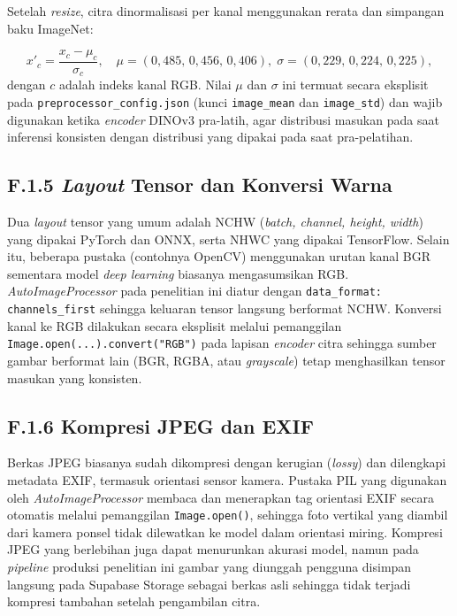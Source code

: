 Setelah \textit{resize}, citra dinormalisasi per kanal menggunakan rerata dan simpangan baku ImageNet:

\begin{equation}
    x'_c = \frac{x_c - \mu_c}{\sigma_c}, \quad
    \mu = (0{,}485,\, 0{,}456,\, 0{,}406), \;
    \sigma = (0{,}229,\, 0{,}224,\, 0{,}225),
    \label{eq:norm}
\end{equation}
dengan $c$ adalah indeks kanal RGB. Nilai $\mu$ dan $\sigma$ ini termuat secara eksplisit pada \texttt{preprocessor\_config.json} (kunci \texttt{image\_mean} dan \texttt{image\_std}) dan wajib digunakan ketika \textit{encoder} DINOv3 pra-latih, agar distribusi masukan pada saat inferensi konsisten dengan distribusi yang dipakai pada saat pra-pelatihan.

\subsection*{F.1.5 \textit{Layout} Tensor dan Konversi Warna}

Dua \textit{layout} tensor yang umum adalah NCHW (\textit{batch, channel, height, width}) yang dipakai PyTorch dan ONNX, serta NHWC yang dipakai TensorFlow. Selain itu, beberapa pustaka (contohnya OpenCV) menggunakan urutan kanal BGR sementara model \textit{deep learning} biasanya mengasumsikan RGB. \textit{AutoImageProcessor} pada penelitian ini diatur dengan \texttt{data\_format: channels\_first} sehingga keluaran tensor langsung berformat NCHW. Konversi kanal ke RGB dilakukan secara eksplisit melalui pemanggilan \texttt{Image.open(...).convert("RGB")} pada lapisan \textit{encoder} citra sehingga sumber gambar berformat lain (BGR, RGBA, atau \textit{grayscale}) tetap menghasilkan tensor masukan yang konsisten.

\subsection*{F.1.6 Kompresi JPEG dan EXIF}

Berkas JPEG biasanya sudah dikompresi dengan kerugian (\textit{lossy}) dan dilengkapi metadata EXIF, termasuk orientasi sensor kamera. Pustaka PIL yang digunakan oleh \textit{AutoImageProcessor} membaca dan menerapkan tag orientasi EXIF secara otomatis melalui pemanggilan \texttt{Image.open()}, sehingga foto vertikal yang diambil dari kamera ponsel tidak dilewatkan ke model dalam orientasi miring. Kompresi JPEG yang berlebihan juga dapat menurunkan akurasi model, namun pada \textit{pipeline} produksi penelitian ini gambar yang diunggah pengguna disimpan langsung pada Supabase Storage sebagai berkas asli sehingga tidak terjadi kompresi tambahan setelah pengambilan citra.

